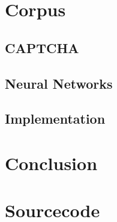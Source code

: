 \documentclass[pdftex,a4paper,12pt,twoside]{report}
\begin{document}

\chapter{Corpus}
\label{ch:corpus}


\section{CAPTCHA}
\label{sec:captcha}


\section{Neural Networks}
\label{sec:neuralnetworks}


\section{Implementation}
\label{sec:implementation}



\chapter{Conclusion}
\label{ch:conclusie}



\appendix

\chapter{Sourcecode}
\label{ch:Sourcecode}

%





\listoffigures
\listoftables

\lstlistoflistings
\end{document}
